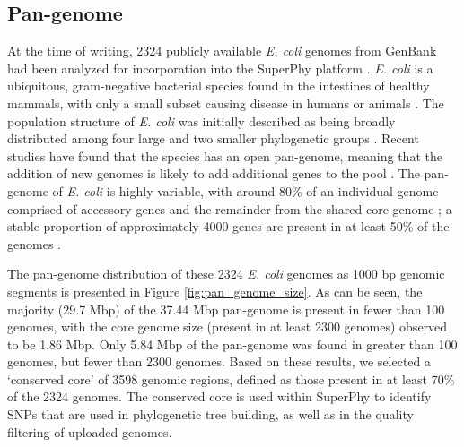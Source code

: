 \documentclass[doublespacing, linenumbers]{bmcart}
\begin{document}
\subsection{Pan-genome}
At the time of writing, 2324 publicly available \textit{E. coli} genomes from GenBank had been analyzed for incorporation into the SuperPhy platform  \cite{benson_genbank_2012}. \textit{E. coli} is a ubiquitous, gram-negative bacterial species found in the intestines of healthy mammals, with only a small subset causing disease in humans or animals \cite{tenaillon_population_2010}. The population structure of \textit{E. coli} was initially described as being broadly distributed among four large and two smaller phylogenetic groups \cite{selander_methods_1986,goullet_comparative_1989}. Recent studies have found that the species has an open pan-genome, meaning that the addition of new genomes is likely to add additional genes to the pool \cite{medini_microbial_2005}. The pan-genome of \textit{E. coli} is highly variable, with around 80\% of an individual genome comprised of accessory genes and the remainder from the shared core genome \cite{lukjancenko_comparison_2010}; a stable proportion of approximately 4000 genes are present in at least 50\% of the genomes \cite{gordienko_evolution_2013}.

The pan-genome distribution of these 2324 \textit{E. coli} genomes as 1000 bp genomic segments is presented in Figure \ref{fig:pan_genome_size}. As can be seen, the majority (29.7 Mbp) of the 37.44 Mbp pan-genome is present in fewer than 100 genomes, with the core genome size (present in at least 2300 genomes) observed to be 1.86 Mbp. Only 5.84 Mbp of the pan-genome was found in greater than 100 genomes, but fewer than 2300 genomes. Based on these results, we selected a  `conserved core' of 3598 genomic regions, defined as those present in at least 70\% of the 2324 genomes. The conserved core is used within SuperPhy to identify SNPs that are used in phylogenetic tree building, as well as in the quality filtering of uploaded genomes.
\end{document}
